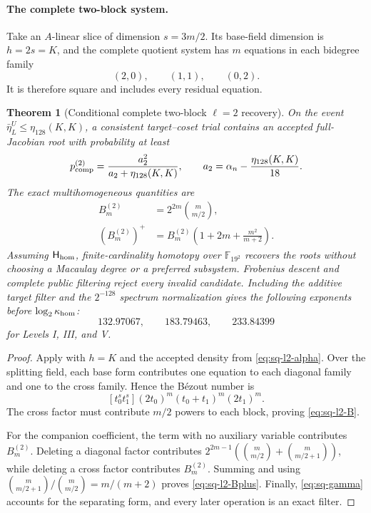 \documentclass[11pt]{article}
\newtheorem{theorem}{Theorem}[section]
\newcommand{\F}{\mathbb F}
\begin{document}
\paragraph{The complete two-block system.}

Take an $A$-linear slice of dimension $s=3m/2$.  Its base-field dimension is
$h=2s=K$, and the complete quotient system has $m$ equations in each
bidegree family
\[
 (2,0),\qquad(1,1),\qquad(0,2).
\]
It is therefore square and includes every residual equation.

\begin{theorem}[Conditional complete two-block $\ell=2$ recovery]
\label{thm:sq-l2-complete}
On the event
$\bar\eta_L^U\le\eta_{128}(K,K)$, a consistent target--coset trial contains
an accepted full-Jacobian root with probability at least
\begin{equation}
 p_{\rm comp}^{(2)}
 =\frac{a_2^2}{a_2+\eta_{128}(K,K)},
 \qquad
 a_2=\alpha_n-\frac{\eta_{128}(K,K)}{18}.            \label{eq:sq-l2-root}
\end{equation}
The exact multihomogeneous quantities are
\begin{align}
 B_m^{(2)}&=2^{2m}\binom m{m/2},                       \label{eq:sq-l2-B}\\
 (B_m^{(2)})^+
 &=B_m^{(2)}\left(1+2m+\frac{m^2}{m+2}\right).       \label{eq:sq-l2-Bplus}
\end{align}
Assuming $\mathsf H_{\rm hom}$, finite-cardinality homotopy over
$\F_{19^2}$ recovers the roots without choosing a Macaulay degree or a
preferred subsystem.  Frobenius descent and complete public filtering reject
every invalid candidate.  Including the additive target filter and the
$2^{-128}$ spectrum normalization gives the following exponents before
$\log_2\kappa_{\rm hom}$:
\[
 132.97067,\qquad183.79463,\qquad233.84399
\]
for Levels I, III, and V.
\end{theorem}

\begin{proof}
Apply  with $h=K$ and the accepted density from
\eqref{eq:sq-l2-alpha}.  Over the splitting field, each base form contributes
one equation to each diagonal family and one to the cross family.  Hence the
B\'ezout number is
\[
 [t_0^st_1^s](2t_0)^m(t_0+t_1)^m(2t_1)^m.
\]
The cross factor must contribute $m/2$ powers to each block, proving
\eqref{eq:sq-l2-B}.

For the companion coefficient, the term with no auxiliary variable contributes
$B_m^{(2)}$.  Deleting a diagonal factor contributes
$2^{2m-1}(\binom m{m/2}+\binom m{m/2+1})$, while deleting a cross factor
contributes $B_m^{(2)}$.  Summing and using
$\binom m{m/2+1}/\binom m{m/2}=m/(m+2)$ proves
\eqref{eq:sq-l2-Bplus}.  Finally, \eqref{eq:sq-gamma} accounts for the
separating form, and every later operation is an exact filter.
\end{proof}
\end{document}
